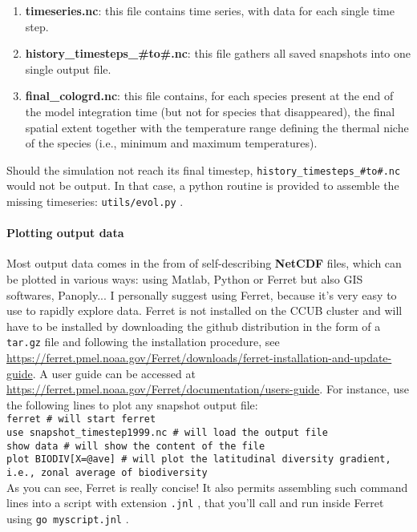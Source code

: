 \documentclass[a4paper, 11pt]{article}
\newcommand\code[1]{%
\texttt{#1}%
}
\begin{document}
\begin{enumerate}
\item \textbf{timeseries.nc}: this file contains time series, with data for each single time step.
\item \textbf{history\_timesteps\_\#to\#.nc}: this file gathers all saved snapshots into one single output file.
\item \textbf{final\_cologrd.nc}: this file contains, for each species present at the end of the model integration time (but not for species that disappeared), the final spatial extent together with the temperature range defining the thermal niche of the species (i.e., minimum and maximum temperatures).
\end{enumerate}

Should the simulation not reach its final timestep, \code{history\_timesteps\_\#to\#.nc} would not be output. In that case, a python routine is provided to assemble the missing timeseries: \code{utils/evol.py}.

\paragraph{Plotting output data}Most output data comes in the from of self-describing \textbf{NetCDF} files, which can be plotted in various ways: using Matlab, Python or Ferret but also GIS softwares, Panoply... I personally suggest using Ferret, because it's very easy to use to rapidly explore data. Ferret is not installed on the CCUB cluster and will have to be installed by downloading the github distribution in the form of a \code{tar.gz} file and following the installation procedure, see \url{https://ferret.pmel.noaa.gov/Ferret/downloads/ferret-installation-and-update-guide}. A user guide can be accessed at \url{https://ferret.pmel.noaa.gov/Ferret/documentation/users-guide}. For instance, use the following lines to plot any snapshot output file:\\

\code{ferret \# will start ferret\\
use snapshot\_timestep1999.nc \# will load the output file\\
show data \# will show the content of the file\\
plot BIODIV[X=@ave] \# will plot the latitudinal diversity gradient, i.e., zonal average of biodiversity}\\

As you can see, Ferret is really concise! It also permits assembling such command lines into a script with extension \code{.jnl}, that you'll call and run inside Ferret using \code{go myscript.jnl}.\\
\end{document}
